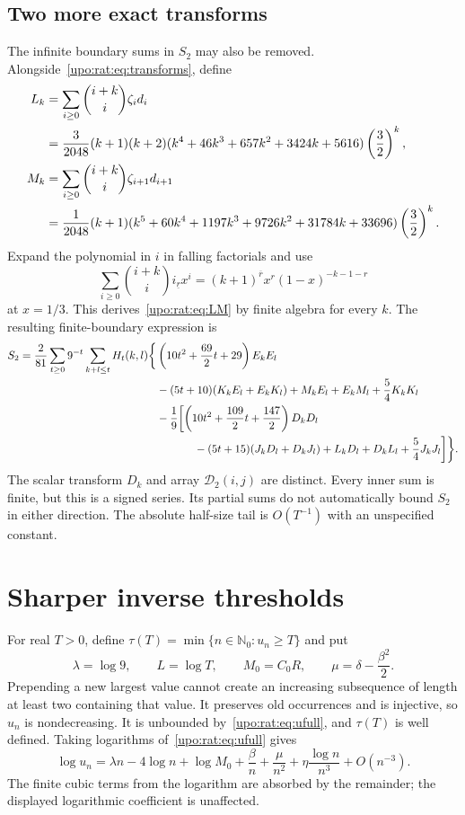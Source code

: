 \documentclass[11pt,letterpaper]{article}
\theoremstyle{remark}\newtheorem{remark}[theorem]{Remark}
\numberwithin{equation}{section}
\newcommand{\N}{\mathbb N_0}
\begin{document}
\subsection{Two more exact transforms}
The infinite boundary sums in $S_2$ may also be removed.
Alongside~\eqref{upo:rat:eq:transforms}, define
\begin{align}
L_k&=\sum_{i\ge0}\binom{i+k}{i}\zeta_i d_i\notag\\
&=\frac3{2048}(k+1)(k+2)
(k^4+46k^3+657k^2+3424k+5616)\left(\frac32\right)^k,\label{upo:rat:eq:LM}\\
M_k&=\sum_{i\ge0}\binom{i+k}{i}\zeta_{i+1}d_{i+1}\notag\\
&=\frac1{2048}(k+1)
(k^5+60k^4+1197k^3+9726k^2+31784k+33696)
\left(\frac32\right)^k.\notag
\end{align}
Expand the polynomial in $i$ in falling factorials and use
\[
\sum_{i\ge0}\binom{i+k}{i}i_{\underline r}x^i
=(k+1)^{\overline r}x^r(1-x)^{-k-1-r}
\]
at $x=1/3$. This derives~\eqref{upo:rat:eq:LM} by finite algebra for every $k$.
The resulting finite-boundary expression is
\begin{align}\label{upo:rat:eq:S2finite}
S_2=\frac2{81}\sum_{t\ge0}9^{-t}\sum_{k+l\le t}H_t(k,l)
\biggl\{&\left(10t^2+\frac{69}2t+29\right)E_kE_l\notag\\
&-(5t+10)(K_kE_l+E_kK_l)
 +M_kE_l+E_kM_l+\frac54K_kK_l\notag\\
&-\frac19\biggl[
\left(10t^2+\frac{109}2t+\frac{147}2\right)D_kD_l\notag\\
&\hspace{12mm}-(5t+15)(J_kD_l+D_kJ_l)
+L_kD_l+D_kL_l+\frac54J_kJ_l\biggr]\biggr\}.
\end{align}
The scalar transform $D_k$ and array $\mathcal D_2(i,j)$ are distinct.
Every inner sum is finite, but this is a signed series. Its partial
sums do not automatically bound $S_2$ in either direction. The absolute
half-size tail is $O(T^{-1})$ with an unspecified constant.

\section{Sharper inverse thresholds}\label{upo:rat:sec:inverse}
For real $T>0$, define $\tau(T)=\min\{n\in\N:u_n\ge T\}$ and put
\[
\lambda=\log9,\qquad L=\log T,\qquad M_0=C_0R,
\qquad \mu=\delta-\frac{\beta^2}{2}.
\]
Prepending a new largest value cannot create an increasing subsequence
of length at least two containing that value. It preserves old
occurrences and is injective, so $u_n$ is nondecreasing. It is unbounded
by~\eqref{upo:rat:eq:ufull}, and $\tau(T)$ is well defined.
Taking logarithms of~\eqref{upo:rat:eq:ufull} gives
\begin{equation}\label{upo:rat:eq:logun}
\log u_n=\lambda n-4\log n+\log M_0+
\frac\beta n+\frac\mu{n^2}+\eta\frac{\log n}{n^3}+O(n^{-3}).
\end{equation}
The finite cubic terms from the logarithm are absorbed by the remainder;
the displayed logarithmic coefficient is unaffected.
\end{document}
